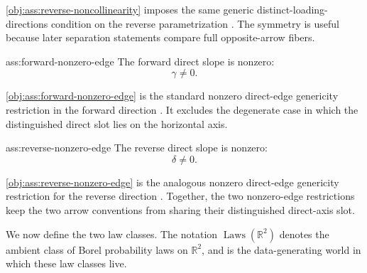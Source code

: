 \cref{obj:ass:reverse-noncollinearity} imposes the same generic distinct-loading-directions condition on the reverse parametrization \citep{SchkodaRobevaDrton2024}. The symmetry is useful because later separation statements compare full opposite-arrow fibers.

\begin{assumptionv}{ass:forward-nonzero-edge}
The forward direct slope is nonzero:
\[
\gamma\ne 0.
\]
\end{assumptionv}

\cref{obj:ass:forward-nonzero-edge} is the standard nonzero direct-edge genericity restriction in the forward direction \citep{ChenPengHuangEtAl2025Direction}. It excludes the degenerate case in which the distinguished direct slot lies on the horizontal axis.

\begin{assumptionv}{ass:reverse-nonzero-edge}
The reverse direct slope is nonzero:
\[
\delta\ne 0.
\]
\end{assumptionv}

\cref{obj:ass:reverse-nonzero-edge} is the analogous nonzero direct-edge genericity restriction for the reverse direction \citep{ChenPengHuangEtAl2025Direction}. Together, the two nonzero-edge restrictions keep the two arrow conventions from sharing their distinguished direct-axis slot.

We now define the two law classes. The notation \(\operatorname{Laws}(\mathbb R^2)\) denotes the ambient class of Borel probability laws on \(\mathbb R^2\), and  is the data-generating world in which these law classes live.


